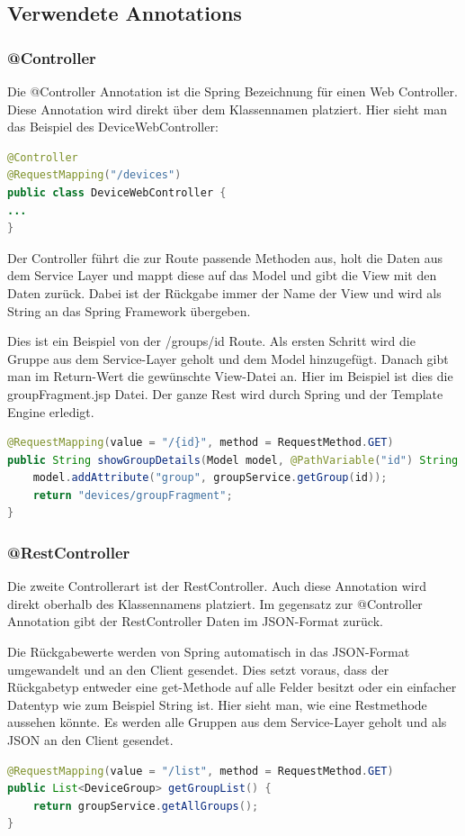 \subsection{Verwendete Annotations}
\subsubsection{@Controller}
Die @Controller Annotation ist die Spring Bezeichnung für einen Web Controller. Diese Annotation wird direkt über dem Klassennamen platziert. Hier sieht man das Beispiel des DeviceWebController:
\begin{lstlisting}[language=java]
@Controller
@RequestMapping("/devices")
public class DeviceWebController {
...
}
\end{lstlisting}

Der Controller führt die zur Route passende Methoden aus, holt die Daten aus dem Service Layer und mappt diese auf das Model und gibt die View mit den Daten zurück. Dabei ist der Rückgabe immer der Name der View und wird als String an das Spring Framework übergeben.

Dies ist ein Beispiel von der /groups/id Route. Als ersten Schritt wird die Gruppe aus dem Service-Layer geholt und dem Model hinzugefügt. Danach gibt man im Return-Wert die gewünschte View-Datei an. Hier im Beispiel ist dies die groupFragment.jsp Datei. Der ganze Rest wird durch Spring und der Template Engine erledigt.
\begin{lstlisting}[language=java]
@RequestMapping(value = "/{id}", method = RequestMethod.GET)
public String showGroupDetails(Model model, @PathVariable("id") String id) {
	model.addAttribute("group", groupService.getGroup(id));
	return "devices/groupFragment";
}
\end{lstlisting}
\subsubsection{@RestController}
Die zweite Controllerart ist der RestController. Auch diese Annotation wird direkt oberhalb des Klassennamens platziert. Im gegensatz zur @Controller Annotation gibt der RestController Daten im JSON-Format zurück. 

Die Rückgabewerte werden von Spring automatisch in das JSON-Format umgewandelt und an den Client gesendet. Dies setzt voraus, dass der Rückgabetyp entweder eine get-Methode auf alle Felder besitzt oder ein einfacher Datentyp wie zum Beispiel String ist.
Hier sieht man, wie eine Restmethode aussehen könnte. Es werden alle Gruppen aus dem Service-Layer geholt und als JSON an den Client gesendet.
\begin{lstlisting}[language=java]
@RequestMapping(value = "/list", method = RequestMethod.GET)
public List<DeviceGroup> getGroupList() {
	return groupService.getAllGroups();
}
\end{lstlisting}

